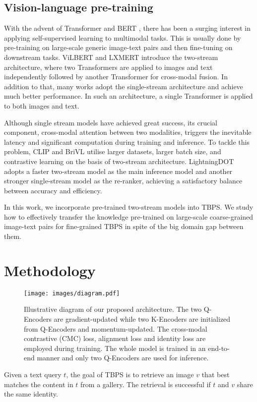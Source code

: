 \documentclass{bmvc2k}
\begin{document}
\vspace*{-3mm}
\subsection{Vision-language pre-training}
With the advent of Transformer \cite{vaswani2017transformer} and BERT \cite{devlin2018bert}, there has been a surging interest in applying self-supervised learning to multimodal tasks. This is usually done by pre-training on large-scale generic image-text pairs and then fine-tuning on downstream tasks.
ViLBERT \cite{lu2019vilbert} and LXMERT \cite{tan2019lxmert} introduce the two-stream architecture, where two Transformers are applied to images and text independently followed by another Transformer for cross-modal fusion. 
In addition to that, many works \cite{su2019vlbert, chen2020uniter,li2020oscar,kim2021vilt} adopt the single-stream architecture and achieve much better performance. 
In such an architecture, a single Transformer is applied to both images and text.

Although single stream models have achieved great success, its crucial component, cross-modal attention between two modalities, triggers the inevitable latency and significant computation during training and inference. 
To tackle this problem, CLIP \cite{radford2021clip} and BriVL \cite{huo2021wenlan} utilise larger datasets, larger batch size, and contrastive learning on the basis of two-stream architecture. 
LightningDOT \cite{sun2021lightningdot} adopts a faster two-stream model as the main inference model and another stronger single-stream model as the re-ranker, achieving a satisfactory balance between accuracy and efficiency.

In this work, we incorporate pre-trained two-stream models into TBPS. 
We study how to effectively transfer the knowledge pre-trained on large-scale coarse-grained image-text pairs for fine-grained TBPS in spite of the big domain gap between them.
 \vspace*{-3mm}
\section{Methodology}

\begin{figure}[t]
\centering
\texttt{[image: images/diagram.pdf]}
\vspace*{-6mm}
\caption{Illustrative diagram of our proposed architecture. The two Q-Encoders are gradient-updated while two K-Encoders are initialized from Q-Encoders and momentum-updated. The cross-modal contrastive (CMC) loss, alignment loss and identity loss are employed during training. The whole model is trained in an end-to-end manner and only two Q-Encoders are used for inference.}
\label{overall_arch}
\vspace*{-3mm}
\end{figure} Given a text query $t$, the goal of TBPS is to retrieve an image $v$ that best matches the content in $t$ from a gallery. 
The retrieval is successful if $t$ and $v$ share the same identity.
\end{document}
